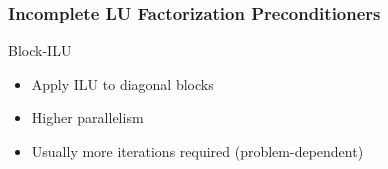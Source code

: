 
\begin{frame}[fragile]
\frametitle{Incomplete LU Factorization Preconditioners}

     \begin{block}{Block-ILU}
      \begin{itemize}
        \item Apply ILU to diagonal blocks
        \item Higher parallelism
        \item Usually more iterations required (problem-dependent)
      \end{itemize}

      \begin{center}
      \end{center}

    \end{block}


\end{frame}



